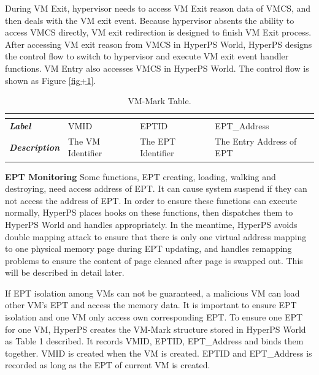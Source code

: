 \documentclass[conference]{IEEEtran}
\begin{document}
 During VM Exit, hypervisor needs to access VM Exit reason data of VMCS, and then deals with the VM exit event.
Because hypervisor absents the ability to access VMCS directly, VM exit redirection is designed to finish VM Exit process. After accessing VM exit reason from VMCS in HyperPS World,  HyperPS designs the control flow to switch to hypervisor and execute VM exit event handler functions. VM Entry also accesses VMCS in HyperPS World. The control flow is shown as Figure \ref{fig+1}.


\begin{table}[htbp]
\centering
\caption{VM-Mark Table.}\label{tab1}
\begin{tabular}{p{1.4cm}|p{1.2cm}|p{1.1cm}|p{1.7cm}}
\hline
\multicolumn{4}{c}{\bfseries\textbf\centering{VM-Mark Table}}\\
\hline
{\itshape\bfseries Label} & VMID & EPTID & EPT\_Address\\
\hline
{\itshape\bfseries Description} & { The VM Identifier} & The EPT Identifier & The Entry Address of EPT\\
\hline
\end{tabular}
\end{table}


\textbf{EPT Monitoring}
Some functions, EPT creating, loading, walking and destroying, need access address of EPT. It can cause system suspend if they can not access the address of EPT. In order to ensure these functions can execute normally, HyperPS places hooks on these functions, then dispatches them to HyperPS World and handles appropriately. In the meantime, HyperPS avoids double mapping attack to ensure that there is only one virtual address mapping to one physical memory page during EPT updating, and handles remapping problems to ensure the content of page cleaned after page is swapped out. This will be described in detail later.

If EPT isolation among VMs can not be guaranteed, a malicious VM can load other VM's EPT and access the memory data. It is important to ensure EPT isolation and one VM only access own corresponding EPT.
To ensure one EPT for one VM, HyperPS creates the VM-Mark structure stored in HyperPS World as Table 1 described. It records VMID, EPTID, EPT\_Address and binds them together. VMID is created when the VM is created. 
 EPTID and EPT\_Address is recorded as long as the EPT of current VM is created.
\end{document}

